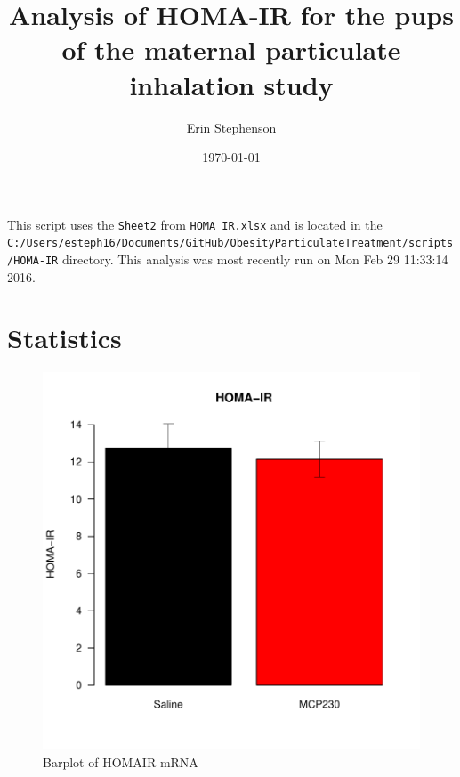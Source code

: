 \documentclass{article}
\begin{document}


\title{Analysis of HOMA-IR for the pups of the maternal particulate inhalation study}
\author{Erin Stephenson}
\date{\today}
\maketitle

This script uses the \verb+Sheet2+ from \verb+HOMA IR.xlsx+ and is located in the \verb+C:/Users/esteph16/Documents/GitHub/ObesityParticulateTreatment/scripts/HOMA-IR+ directory.  This analysis was most recently run on Mon Feb 29 11:33:14 2016.  

\section*{Statistics}
\begin{figure}
\begin{center}
\includegraphics{MaternalParticulateHOMA-IR-barplotHOMAIR}
\end{center}
\caption{Barplot of HOMAIR mRNA}
\label{fig:barplotHOMAIR}
\end{figure}
\end{document}
